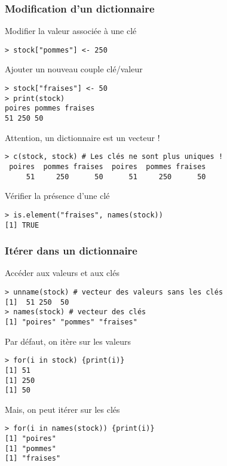 \documentclass[10pt]{beamer}
\begin{document}
\begin{frame}[fragile]
  \frametitle{Modification d'un dictionnaire }

\begin{block}{Modifier la valeur associée à une clé}
  \begin{lstlisting}[style=block]
> stock["pommes"] <- 250
\end{lstlisting}
\end{block}

\begin{block}{Ajouter un nouveau couple clé/valeur}
  \begin{lstlisting}[style=block]
> stock["fraises"] <- 50
> print(stock)
poires pommes fraises
51 250 50
\end{lstlisting}
\end{block}

\begin{block}{Attention, un dictionnaire est un vecteur !}
\begin{lstlisting}[style=block]
> c(stock, stock) # Les clés ne sont plus uniques !
 poires  pommes fraises  poires  pommes fraises
     51     250      50      51     250      50
   \end{lstlisting}
 \end{block}

 \begin{block}{Vérifier la présence d'une clé}
    \begin{lstlisting}[style=block]
> is.element("fraises", names(stock))
[1] TRUE
\end{lstlisting}
\end{block}


\end{frame}

\begin{frame}[fragile]
  \frametitle{Itérer dans un dictionnaire}
  \begin{block}{Accéder aux valeurs et aux clés}
    \begin{lstlisting}[style=block]
> unname(stock) # vecteur des valeurs sans les clés
[1]  51 250  50
> names(stock) # vecteur des clés
[1] "poires" "pommes" "fraises"
\end{lstlisting}
\end{block}

\begin{block}{Par défaut, on itère sur les valeurs}
\begin{lstlisting}[style=block]
> for(i in stock) {print(i)}
[1] 51
[1] 250
[1] 50
\end{lstlisting}
\end{block}

\begin{block}{Mais, on peut itérer sur les clés}
\begin{lstlisting}[style=block]
> for(i in names(stock)) {print(i)}
[1] "poires"
[1] "pommes"
[1] "fraises"
\end{lstlisting}
\end{block}
\end{frame}
\end{document}
